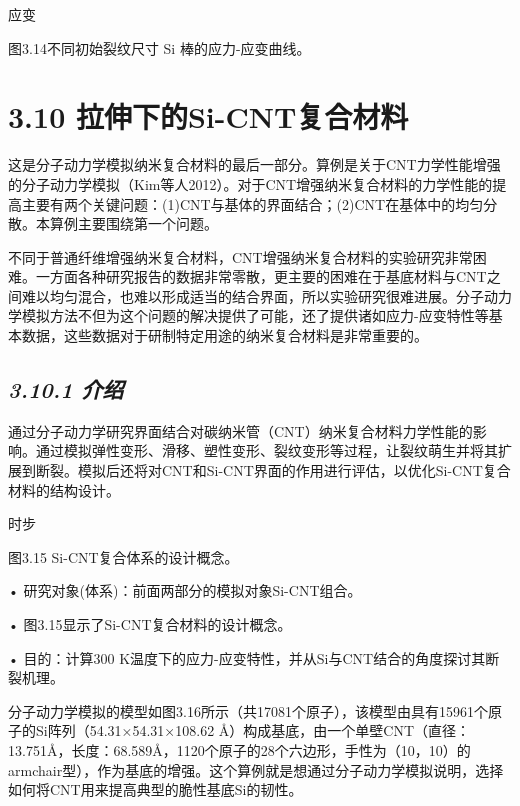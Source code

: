 
应变

图3.14不同初始裂纹尺寸 Si 棒的应力-应变曲线。

\hypertarget{ux62c9ux4f38ux4e0bux7684si-cntux590dux5408ux6750ux6599}{%
\section{3.10
拉伸下的Si-CNT复合材料}\label{ux62c9ux4f38ux4e0bux7684si-cntux590dux5408ux6750ux6599}}

这是分子动力学模拟纳米复合材料的最后一部分。算例是关于CNT力学性能增强的分子动力学模拟（Kim等人2012）。对于CNT增强纳米复合材料的力学性能的提高主要有两个关键问题：(1)CNT与基体的界面结合；(2)CNT在基体中的均匀分散。本算例主要围绕第一个问题。

不同于普通纤维增强纳米复合材料，CNT增强纳米复合材料的实验研究非常困难。一方面各种研究报告的数据非常零散，更主要的困难在于基底材料与CNT之间难以均匀混合，也难以形成适当的结合界面，所以实验研究很难进展。分子动力学模拟方法不但为这个问题的解决提供了可能，还了提供诸如应力-应变特性等基本数据，这些数据对于研制特定用途的纳米复合材料是非常重要的。

\hypertarget{ux4ecbux7ecd-1}{%
\subsection{\texorpdfstring{\emph{3.10.1
介绍}}{3.10.1 介绍}}\label{ux4ecbux7ecd-1}}

通过分子动力学研究界面结合对碳纳米管（CNT）纳米复合材料力学性能的影响。通过模拟弹性变形、滑移、塑性变形、裂纹变形等过程，让裂纹萌生并将其扩展到断裂。模拟后还将对CNT和Si-CNT界面的作用进行评估，以优化Si-CNT复合材料的结构设计。


时步

图3.15 Si-CNT复合体系的设计概念。

• 研究对象(体系)：前面两部分的模拟对象Si-CNT组合。

• 图3.15显示了Si-CNT复合材料的设计概念。

• 目的：计算300
K温度下的应力-应变特性，并从Si与CNT结合的角度探讨其断裂机理。

分子动力学模拟的模型如图3.16所示（共17081个原子），该模型由具有15961个原子的Si阵列（54.31×54.31×108.62
Å）构成基底，由一个单壁CNT（直径：13.751Å，长度：68.589Å，1120个原子的28个六边形，手性为（10，10）的armchair型），作为基底的增强。这个算例就是想通过分子动力学模拟说明，选择如何将CNT用来提高典型的脆性基底Si的韧性。

